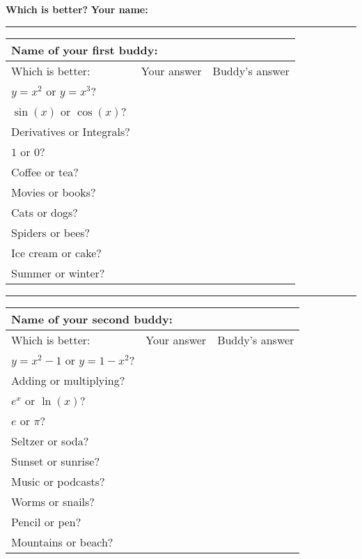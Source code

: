 \documentclass[11pt]{article}
\begin{document}
\vspace*{-0.5in}
\textbf{Which is better?}\hspace*{2in} \textbf{Your name:}\\
\rule{\textwidth}{.4pt}

\begin{center} \begin{tabular}{|p{2in}|p{1.5in}|p{1.5in}|}
    \hline
    \multicolumn{3}{|l|}{Name of your first buddy: }\\[12pt] \hline
    Which is better: & Your answer & Buddy's answer \\ \hline
    $y = x^2$ or $y=x^3$? & &\\[12pt] \hline
    $\sin(x)$ or $\cos(x)$? & & \\[12pt] \hline
    Derivatives or Integrals?  & &\\[12pt] \hline
    $1$ or $0$? & &\\[12pt] \hline
    Coffee or tea? & &\\[12pt] \hline
    Movies or books? & &\\[12pt]\hline
    Cats or dogs? & &\\[12pt]\hline
    Spiders or bees? & &\\[12pt] \hline
    Ice cream or cake?& &\\[12pt]\hline
    Summer or winter? & &\\[12pt]\hline
    
    
\end{tabular}
\rule{\textwidth}{.4pt}
\vfill\noindent \begin{tabular}{|p{2in}|p{1.5in}|p{1.5in}|}
    \hline
    \multicolumn{3}{|l|}{Name of your second buddy: }\\[12pt] \hline
    Which is better: & Your answer & Buddy's answer\\ \hline
    $y = x^2-1$ or $y=1-x^2$?&  & \\[12pt] \hline
    Adding or multiplying? & & \\[12pt] \hline
    $e^x$ or $\ln(x)$? & &\\[12pt] \hline
    $e$ or $\pi$?&  &\\[12pt] \hline
    Seltzer or soda?&  &\\[12pt] \hline
    Sunset or sunrise?&  &\\[12pt]\hline
    Music or podcasts? & &\\[12pt]\hline
    Worms or snails?& &\\[12pt] \hline
    Pencil or pen?& &\\[12pt]\hline
    Mountains or beach?& &\\[12pt]\hline
    
    
\end{tabular}
\end{center}
\end{document}

